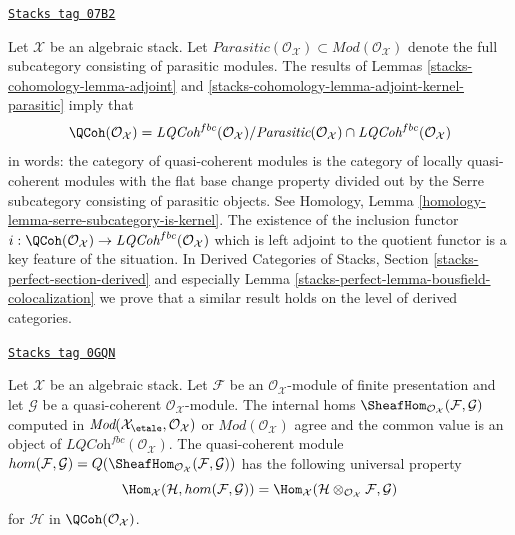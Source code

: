 \begin{remark}
\label{stacks-cohomology-remark-bousfield-colocalization}
\href{https://stacks.math.columbia.edu/tag/07B2}{\texttt{Stacks tag 07B2}}

Let $\mathcal{X}$ be an algebraic stack. Let
$\textit{Parasitic}(\mathcal{O}_\mathcal{X}) \subset
\textit{Mod}(\mathcal{O}_\mathcal{X})$ denote the
full subcategory consisting of parasitic modules. The results of
Lemmas \ref{stacks-cohomology-lemma-adjoint} and \ref{stacks-cohomology-lemma-adjoint-kernel-parasitic}
imply that
$$
\QCoh(\mathcal{O}_\mathcal{X}) =
\textit{LQCoh}^{fbc}(\mathcal{O}_\mathcal{X}) /
\textit{Parasitic}(\mathcal{O}_\mathcal{X})
\cap \textit{LQCoh}^{fbc}(\mathcal{O}_\mathcal{X})
$$
in words: the category of quasi-coherent modules is the category
of locally quasi-coherent modules with the flat base change property
divided out by the Serre subcategory consisting of parasitic objects.
See Homology, Lemma \ref{homology-lemma-serre-subcategory-is-kernel}.
The existence of the inclusion functor
$i : \QCoh(\mathcal{O}_\mathcal{X}) \to
\textit{LQCoh}^{fbc}(\mathcal{O}_\mathcal{X})$
which is left adjoint to the quotient functor is a key feature of
the situation. In Derived Categories of Stacks, Section
\ref{stacks-perfect-section-derived} and especially
Lemma \ref{stacks-perfect-lemma-bousfield-colocalization}
we prove that a similar result holds on the level of derived categories.
\end{remark}

\begin{lemma}
\label{stacks-cohomology-lemma-internal-hom-fp-into-qcoh}
\href{https://stacks.math.columbia.edu/tag/0GQN}{\texttt{Stacks tag 0GQN}}

Let $\mathcal{X}$ be an algebraic stack. Let $\mathcal{F}$ be an
$\mathcal{O}_\mathcal{X}$-module of finite presentation and let
$\mathcal{G}$ be a quasi-coherent $\mathcal{O}_\mathcal{X}$-module.
The internal homs
$\SheafHom_{\mathcal{O}_\mathcal{X}}(\mathcal{F}, \mathcal{G})$
computed in
$\textit{Mod}(\mathcal{X}_\etale, \mathcal{O}_\mathcal{X})$ or
$\textit{Mod}(\mathcal{O}_\mathcal{X})$ agree and the common value
is an object of $\textit{LQCoh}^{fbc}(\mathcal{O}_\mathcal{X})$.
The quasi-coherent module
$
hom(\mathcal{F}, \mathcal{G}) =
Q(\SheafHom_{\mathcal{O}_\mathcal{X}}(\mathcal{F}, \mathcal{G}))
$
has the following universal property
$$
\Hom_\mathcal{X}(\mathcal{H}, hom(\mathcal{F}, \mathcal{G})) =
\Hom_\mathcal{X}(\mathcal{H} \otimes_{\mathcal{O}_\mathcal{X}} \mathcal{F},
\mathcal{G})
$$
for $\mathcal{H}$ in $\QCoh(\mathcal{O}_\mathcal{X})$.
\end{lemma}

